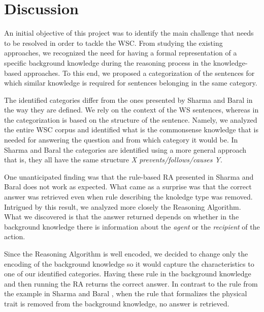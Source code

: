 \section{Discussion}
\label{section:Discussion}


An initial objective of this project was to identify the main challenge that needs to be resolved in order to tackle the WSC.
From studying the existing approaches, we recognized the need for having a formal representation of a specific background knowledge during the reasoning process in the knowledge-based approaches. To this end, we proposed a categorization of the sentences for which similar knowledge is required for sentences belonging in the same category.


The identified categories differ from the ones presented by Sharma and Baral \cite{2018CommonsenseKT} in the way they are defined. We rely on the context of the WS sentences, whereas in \cite{2018CommonsenseKT} the categorization is based on the structure of the sentence. Namely, we analyzed the entire WSC corpus and identified what is the commonsense knowledge that is needed for answering the question and from which category it would be. In Sharma and Baral \cite{2018CommonsenseKT} the categories are identified using a more general approach that is, they all have the same structure \textit{X prevents/follows/causes Y}. 

One unanticipated finding was that the rule-based RA presented in Sharma and Baral \cite{2018CommonsenseKT} does not work as expected.  What came as a surprise was that the correct answer was retrieved even when rule describing the knoledge type was removed.  
Intrigued by this result, we analyzed more closely the Reasoning Algorithm. What we discovered is that the answer returned depends on whether in the background knowledge there is information about the \textit{agent} or the \textit{recipient} of the action. 

Since the Reasoning Algorithm is well encoded, we decided to change only the encoding of the background knowledge so it would capture the characteristics to one of our identified categories. 
Having these rule in the background knowledge and then running the RA returns the correct answer. In contrast to the rule from the example in Sharma and Baral \cite{2018CommonsenseKT}, when the rule that formalizes the physical trait is removed from the background knowledge, no answer is retrieved. 

